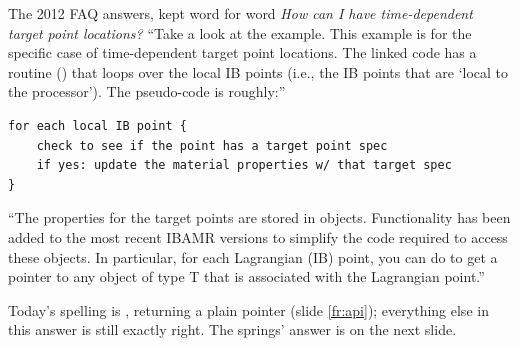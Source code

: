 \documentclass[aspectratio=169,11pt]{beamer}
\begin{document}
\begin{frame}[fragile]{The 2012 FAQ answers, kept word for word}
\label{fr:faq}
\small \emph{How can I have time-dependent target point locations?} ``Take a look at the  example. This example is for the specific case of time-dependent target point locations. The linked code has a routine () that loops over the local IB points (i.e., the IB points that are `local to the processor'). The pseudo-code is roughly:''
\begin{lstlisting}[style=data]
for each local IB point {
    check to see if the point has a target point spec
    if yes: update the material properties w/ that target spec
}
\end{lstlisting}
\small ``The properties for the target points are stored in  objects. Functionality has been added to the most recent IBAMR versions to simplify the code required to access these objects. In particular, for each Lagrangian (IB) point, you can do  to get a pointer to any object of type T that is associated with the Lagrangian point.''
\vspace{1mm}

\footnotesize Today's spelling is , returning a plain pointer (slide \ref{fr:api}); everything else in this answer is still exactly right. The springs' answer is on the next slide.
\end{frame}
\end{document}
